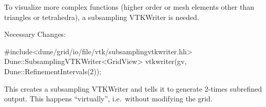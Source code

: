\documentclass[aspectratio=169,11pt]{beamer}
\theoremstyle{definition}
\begin{document}
\begin{frame}
\framebreak

To visualize more complex functions (higher order or mesh elements other than
triangles or tetrahedra), a subsampling VTKWriter is needed.

Necessary Changes:

\begin{cppcode}
#include<dune/grid/io/file/vtk/subsamplingvtkwriter.hh>
Dune::SubsamplingVTKWriter<GridView> vtkwriter(gv, Dune::RefinementIntervals(2));
\end{cppcode}

This creates a subsampling VTKWriter and tells it to generate 2-times
subrefined output. %
This happens ``virtually'', i.e.\ without modifying the grid.
\end{frame}

\end{document}
